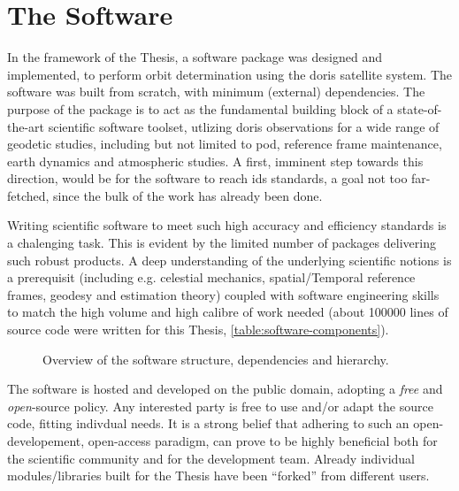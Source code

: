 \section{The Software}\label{sec:the-software}

In the framework of the Thesis, a software package was designed and implemented, to 
perform orbit determination using the \gls{doris} satellite system. The software 
was built from scratch, with minimum (external) dependencies. The purpose of the 
package is to act as the fundamental building block of a state-of-the-art scientific 
software toolset, utlizing \gls{doris} observations for a wide range of geodetic 
studies, including but not limited to \gls{pod}, reference frame maintenance, 
earth dynamics and atmospheric studies. A first, imminent step towards this direction, 
would be for the software to reach \gls{ids} standards, a goal not too far-fetched, 
since the bulk of the work has already been done.

Writing scientific software to meet such high accuracy and efficiency standards 
is a chalenging task. This is evident by the limited number of packages delivering 
such robust products. A deep understanding of the underlying scientific notions is 
a prerequisit (including e.g. celestial mechanics, spatial/Temporal reference frames, 
geodesy and estimation theory) coupled with software engineering skills to match the 
high volume and high calibre of work needed (about 100000 lines of source code were 
written for this Thesis, \autoref{table:software-components}).

\begin{figure}
  \centering
  
  \caption{Overview of the software structure, dependencies and hierarchy.}
  \label{fig:software-hierarchy}
\end{figure}

The software is hosted and developed on the public domain, adopting a \emph{free} 
and \emph{open}-source policy. Any interested party is free to use and/or adapt 
the source code, fitting indivdual needs. It is a strong belief that adhering to 
such an open-developement, open-access paradigm, can prove to be highly beneficial 
both for the scientific community and for the development team. Already individual 
modules/libraries built for the Thesis have been ``forked'' from different users.

